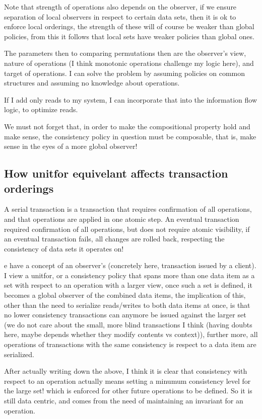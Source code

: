 Note that strength of operations also depends on the observer, if we ensure
separation of local observers in respect to certain data sets, then it is ok to
enforce local orderings, the strength of these will of course be weaker than
global policies, from this it follows that local sets have weaker policies than
global ones.

The parameters then to comparing permutations then are the observer's view,
nature of operations (I think monotonic operations challenge my logic here), and
target of operations. I can solve the problem by assuming policies on common
structures and assuming no knowledge about operations. 

If I add only reads to my system, I can incorporate that into the information flow logic,
to optimize reads. 

We must not forget that, in order to make the compositional property hold and
make sense, the consistency policy in question must be composable, that is, make
sense in the eyes of a more global observer!

\subsection{How unitfor equivelant affects transaction orderings}
A serial transaction is a transaction that requires confirmation of all
operations, and that operations are applied 
in one atomic step. An eventual transaction required confirmation of all
operations, but does not require atomic visibility, if an eventual transaction
fails, all changes are rolled back, respecting the consistency of data sets it
operates on! 

e have a concept of an observer's (concretely here, transaction issued by a
client). I view a unitfor, or a consistency policy that spans more than one data
item as a set with respect to an operation with a larger view, once such a set
is defined, it becomes a global observer of the combined data items, the
implication of this, other than the need to serialize reads/writes to both data
items at once, is that no lower consistency transactions can anymore be issued
against the larger set (we do not care about the small, more blind transactions
I think (having doubts here, maybe depends whether they modify contents vs
context)), further more, all operations of transactions with the same
consistency is respect to a data item are serialized. 

After actually writing down the above, I think it is clear that consistency with
respect to an operation actually means setting a minumum consistency level for
the large set! which is enforced for other future operations to be defined. So
it is still data centric, and comes from the need of maintaining an invariant
for an operation. 

